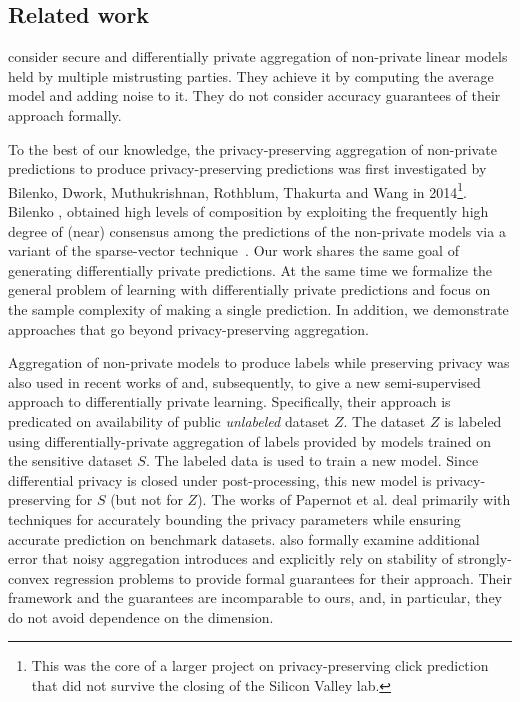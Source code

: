 \documentclass[final,12pt]{colt2018}
\begin{document}
\subsection{Related work}
\label{sec:related}
\citet{PathakRR10} consider secure and differentially private aggregation of non-private linear models held by multiple mistrusting parties. They achieve it by computing the average model and adding noise to it. They do not consider accuracy guarantees of their approach formally.

To the best of our knowledge, the privacy-preserving aggregation of non-private predictions to produce privacy-preserving predictions was first investigated by Bilenko, Dwork, Muthukrishnan, Rothblum, Thakurta and Wang in 2014\footnote{This was the core of a larger project on privacy-preserving click prediction that did not survive the closing of the Silicon Valley lab.}.   Bilenko \etal, obtained high levels of composition by exploiting the frequently high degree of (near) consensus among the predictions of the non-private models via a variant of the sparse-vector technique~\cite{DworkRoth:14}.  Our work shares the same goal of generating differentially private predictions. At the same time we formalize the general problem of learning with differentially private predictions and focus on the sample complexity of making a single prediction. In addition, we demonstrate approaches that go beyond privacy-preserving aggregation.


Aggregation of non-private models to produce labels while preserving privacy was also used in recent works of \citet{HammCB16} and, subsequently, \citet{PapernotAEGT17,papernot2018scalable} to give a new semi-supervised approach to differentially private learning. Specifically, their approach is predicated on availability of public {\em unlabeled} dataset $Z$. The dataset $Z$ is labeled using differentially-private aggregation of labels provided by models trained on the sensitive dataset $S$. The labeled data is used to train a new model. Since differential privacy is closed under post-processing, this new model is privacy-preserving for $S$ (but not for $Z$).
The works of Papernot et al. \citep{PapernotAEGT17,papernot2018scalable} deal primarily with techniques for accurately bounding the privacy parameters while ensuring accurate prediction on benchmark datasets. \citet{HammCB16} also formally examine additional error that noisy aggregation introduces and explicitly rely on stability of strongly-convex regression problems to provide formal guarantees for their approach. Their framework and the guarantees are incomparable to ours, and, in particular, they do not avoid dependence on the dimension.
\end{document}
